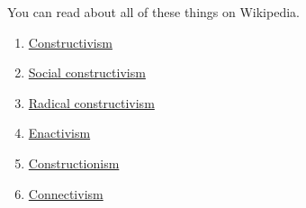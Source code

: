 You can read about all of these things on Wikipedia.

\begin{enumerate}
\item
  \href{http://en.wikipedia.org/wiki/Constructivism\_(philosophy\_of\_education)}{Constructivism}
\item
  \href{http://en.wikipedia.org/wiki/Social\_constructivism}{Social
  constructivism}
\item
  \href{http://www.english.iup.edu/mmwimson/Syllabi/803/721/Radical\%20Constructivism\%20\%20\%20721.htm}{Radical
  constructivism}
\item
  \href{http://en.wikipedia.org/wiki/Enactivism\_(psychology)}{Enactivism}
\item
  \href{http://en.wikipedia.org/wiki/Constructionism\_(learning\_theory)}{Constructionism}
\item
  \href{http://en.wikipedia.org/wiki/Connectivism}{Connectivism}
\end{enumerate}
